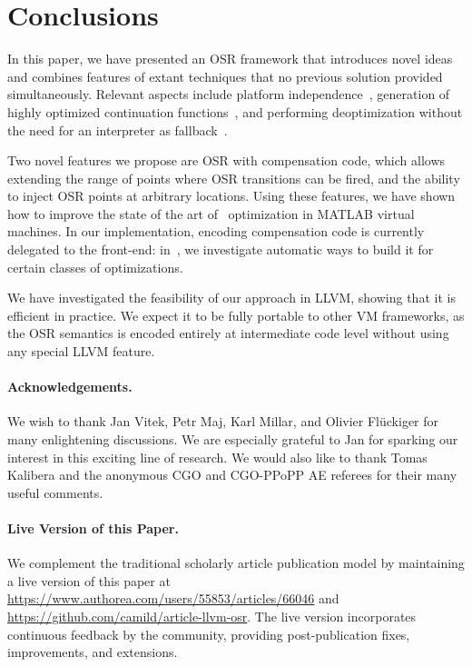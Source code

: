 
\section{Conclusions}
\label{se:conclusions}

In this paper, we have presented an OSR framework that introduces novel ideas and combines features of extant techniques that no previous solution provided simultaneously. Relevant aspects include platform independence~\cite{lameed2013modular}, generation of highly optimized continuation functions~\cite{fink2003design}, and performing deoptimization without the need for an interpreter as fallback~\cite{bebenita2010spur}.

Two novel features we propose are OSR with compensation code, which allows extending the range of points where OSR transitions can be fired, and the ability to inject OSR points at arbitrary locations. Using these features, we have shown how to improve the state of the art of \feval\ optimization in MATLAB virtual machines. In our implementation, encoding compensation code is currently delegated to the front-end: in~\cite{OSRaLaCarte}, we investigate automatic ways to build it for certain classes of optimizations.

We have investigated the feasibility of our approach in LLVM, showing that it is efficient in practice. We expect it to be fully portable to other VM frameworks, as the OSR semantics is 
encoded entirely 	at intermediate code level without using any special LLVM feature.

\paragraph{Acknowledgements.}

We wish to thank Jan Vitek, Petr Maj, Karl Millar, and Olivier Fl{\"u}ckiger for many enlightening discussions. We are especially grateful to Jan for sparking our interest in this exciting line of research. 
We would also like to thank Tomas Kalibera and the anonymous CGO and CGO-PPoPP AE referees for their many useful comments.

\paragraph{Live Version of this Paper.}
We complement the traditional scholarly article publication model by maintaining a live version of this paper at {\small\url{https://www.authorea.com/users/55853/articles/66046}} and {\small\url{https://github.com/camild/article-llvm-osr}}. The live version incorporates continuous feedback by the community, providing post-publication fixes, improvements, and extensions.
